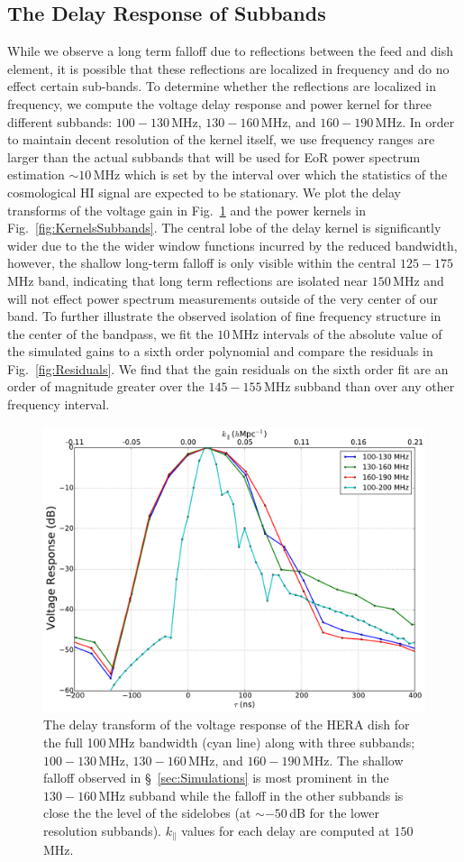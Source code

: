 \documentclass[twocolumn]{emulateapj}
\begin{document}
\subsection{The Delay Response of Subbands}\label{ssec:Subbands}
While we observe a long term falloff due to reflections between the feed and dish element, it is possible that these reflections are localized in frequency and do no effect certain sub-bands. To determine whether the reflections are localized in frequency, we compute the voltage delay response and power kernel for three different subbands: $100-130$\,MHz, $130-160$\,MHz, and $160-190$\,MHz. In order to maintain decent resolution of the kernel itself, we use frequency ranges are larger than the actual subbands that will be used for EoR power spectrum estimation $\sim 10$\,MHz which is set by the interval over which the statistics of the cosmological HI signal are expected to be stationary. We plot the delay transforms of the voltage gain in Fig.~\ref{fig:GainDelaySubbands} and the power kernels in Fig.~\ref{fig:KernelsSubbands}. The central lobe of the delay kernel is significantly wider due to the the wider window functions incurred by the reduced bandwidth, however, the shallow long-term falloff is only visible within the central $125-175$\,MHz band, indicating that long term reflections are isolated near $150$\,MHz and will not effect power spectrum measurements outside of the very center of our band.
To further illustrate the observed isolation of fine frequency structure in the center of the bandpass, we fit the $10$\,MHz intervals of the absolute value of the simulated gains to a sixth order polynomial and compare the residuals in Fig.~\ref{fig:Residuals}. We find that the gain residuals on the sixth order fit are an order of magnitude greater over the $145-155$\,MHz subband than over any other frequency interval. 

\begin{figure}[h!]
\includegraphics[width=.5\textwidth]{figures/voltageResponseSubbands.pdf}
\caption{The delay transform of the voltage response of the HERA dish for the full 100\,MHz bandwidth (cyan line) along with three subbands; $100-130$\,MHz, $130-160$\,MHz, and $160-190$\,MHz. The shallow falloff observed in \S~\ref{sec:Simulations} is most prominent in the $130-160$\,MHz subband while the falloff in the other subbands is close the the level of the sidelobes (at $\sim -50$\,dB for the lower resolution subbands). $k_\parallel$ values for each delay are computed at $150$\,MHz.}
\label{fig:GainDelaySubbands}
\end{figure}
\end{document}
